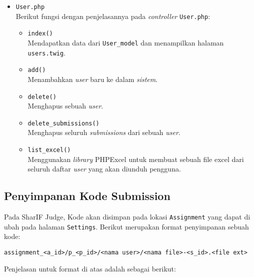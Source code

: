 \begin{itemize}
      \item \verb|User.php| \\
            Berikut fungsi dengan penjelasannya pada \textit{controller} \verb|User.php|:

            \begin{itemize}
                  \item \verb|index()| \\
                        Mendapatkan data dari \verb|User_model| dan menampilkan halaman \verb|users.twig|.
                  \item \verb|add()| \\
                        Menambahkan \textit{user} baru ke dalam \textit{sistem}.
                  \item \verb|delete()| \\
                        Menghapus sebuah \textit{user}.
                  \item \verb|delete_submissions()| \\
                        Menghapus seluruh \textit{submissions} dari sebuah \textit{user}.
                  \item \verb|list_excel()| \\
                        Menggunakan \textit{library} PHPExcel untuk membuat sebuah file excel dari seluruh daftar \textit{user} yang akan diunduh pengguna.
            \end{itemize}

\end{itemize}

\subsection{Penyimpanan Kode Submission}
\label{sec:3:1:penyimpanankode}
Pada SharIF Judge, Kode akan disimpan pada lokasi \verb|Assignment| yang dapat di ubah pada halaman \verb|Settings|. Berikut merupakan format penyimpanan sebuah kode:

\begin{center}
      \verb|assignment_<a_id>/p_<p_id>/<nama user>/<nama file>-<s_id>.<file ext>|
\end{center}

Penjelasan untuk format di atas adalah sebagai berikut:

